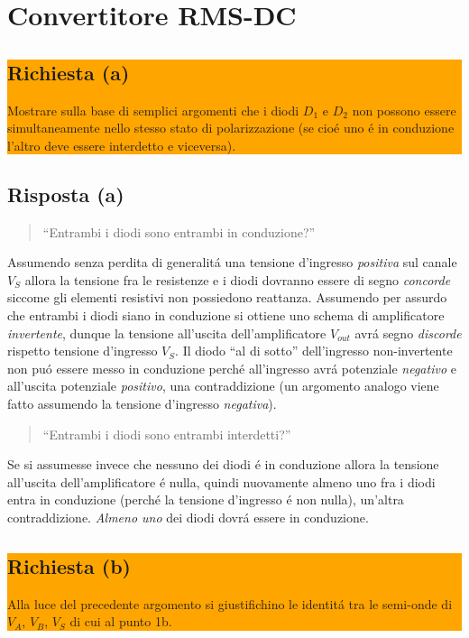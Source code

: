\section*{Convertitore RMS-DC}

\noindent\colorbox{orange}{
  \begin{minipage}{1.0\linewidth}
    \subsection*{Richiesta (a)}
    Mostrare sulla base di semplici argomenti che i diodi $D_1$ e $D_2$ non possono essere
    simultaneamente nello stesso stato di polarizzazione (se cio\'e uno \'e in conduzione l'altro deve
    essere interdetto e viceversa).
  \end{minipage}
}
\subsection*{Risposta (a)}
\begin{quote}
  ``Entrambi i diodi sono entrambi in conduzione?''
\end{quote}
Assumendo senza perdita di generalit\'a una tensione d'ingresso \textit{positiva}
sul canale $V_S$ allora la tensione fra le resistenze e i diodi dovranno essere di segno
\textit{concorde} siccome gli elementi resistivi non possiedono reattanza. Assumendo per
assurdo che entrambi i diodi siano in conduzione si ottiene uno schema di amplificatore
\textit{invertente}, dunque la tensione all'uscita dell'amplificatore $V_{out}$ avr\'a
segno \textit{discorde} rispetto tensione d'ingresso $V_S$. Il diodo ``al di sotto''
dell'ingresso non-invertente non pu\'o essere messo in conduzione perch\'e all'ingresso
avr\'a potenziale \textit{negativo} e all'uscita potenziale \textit{positivo}, una
contraddizione (un argomento analogo viene fatto assumendo la tensione d'ingresso \textit{negativa}).

\begin{quote}
  ``Entrambi i diodi sono entrambi interdetti?''
\end{quote}
Se si assumesse invece che nessuno dei diodi \'e in conduzione allora la tensione all'uscita
dell'amplificatore \'e nulla, quindi nuovamente almeno uno fra i diodi entra in conduzione
(perch\'e la tensione d'ingresso \'e non nulla), un'altra contraddizione.
\textit{Almeno uno} dei diodi dovr\'a essere in conduzione. \\

\noindent\colorbox{orange}{
  \begin{minipage}{1.0\linewidth}
    \subsection*{Richiesta (b)}
    Alla luce del precedente argomento si giustifichino le identit\'a tra le semi-onde di $V_A$, $V_B$, $V_S$
    di cui al punto 1b.
  \end{minipage}
}
